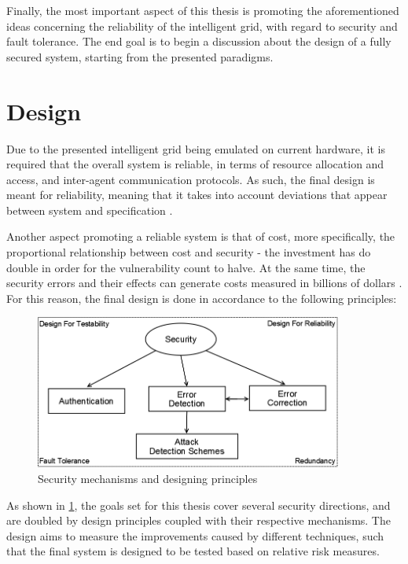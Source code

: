 \documentclass[12pt, english, a4paper]{report}
\begin{document}
Finally, the most important aspect of this thesis is promoting the aforementioned ideas concerning the reliability of the intelligent grid,
with regard to security and fault tolerance. The end goal is to begin a discussion about the design of a fully secured system, starting
from the presented paradigms.

\section{Design}

Due to the presented intelligent grid being emulated on current hardware, it is required that the overall system is reliable, in terms of
resource allocation and access, and inter-agent communication protocols. As such, the final design is meant for reliability, meaning that
it takes into account deviations that appear between system and specification \cite{36, 113}.

Another aspect promoting a reliable system is that of cost, more specifically, the proportional relationship between cost and security -
the investment has do double in order for the vulnerability count to halve. At the same time, the security errors and their effects can
generate costs measured in billions of dollars \cite{113, 114}. For this reason, the final design is done in accordance to the following
principles:

\begin{figure}[H]
	\includegraphics[width=0.9\textwidth, height=0.65\textwidth]{Pic1}
	\caption{Security mechanisms and designing principles \label{fig:designPrinciples}}
\end{figure}

As shown in \cref{fig:designPrinciples}, the goals set for this thesis cover several security directions, and are doubled by design principles
coupled with their respective mechanisms. The design aims to measure the improvements caused by different techniques, such that the final
system is designed to be tested based on relative risk measures.
\end{document}
